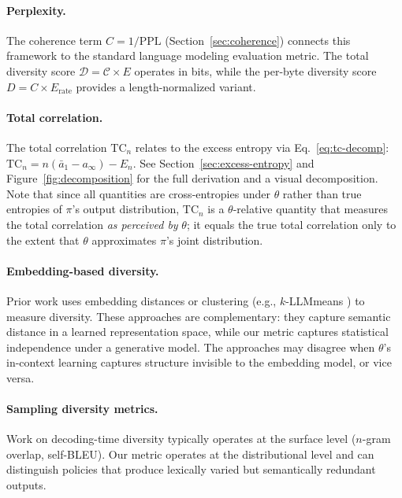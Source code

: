 \documentclass[11pt]{article}
\newcommand{\TC}{\mathrm{TC}}
\begin{document}
\paragraph{Perplexity.} The coherence term $C = 1/\mathrm{PPL}$ (Section~\ref{sec:coherence}) connects this framework to the standard language modeling evaluation metric. The total diversity score $\mathcal{D} = \mathcal{C} \times E$ operates in bits, while the per-byte diversity score $D = C \times E_{\mathrm{rate}}$ provides a length-normalized variant.

\paragraph{Total correlation.} The total correlation $\TC_n$ relates to the excess entropy via Eq.~\eqref{eq:tc-decomp}: $\TC_n = n(\bar{a}_1 - a_\infty) - E_n$. See Section~\ref{sec:excess-entropy} and Figure~\ref{fig:decomposition} for the full derivation and a visual decomposition. Note that since all quantities are cross-entropies under $\theta$ rather than true entropies of $\pi$'s output distribution, $\TC_n$ is a $\theta$-relative quantity that measures the total correlation \emph{as perceived by} $\theta$; it equals the true total correlation only to the extent that $\theta$ approximates $\pi$'s joint distribution.

\paragraph{Embedding-based diversity.} Prior work uses embedding distances or clustering (e.g., $k$-LLMmeans \citep{lai2024llmmeans}) to measure diversity. These approaches are complementary: they capture semantic distance in a learned representation space, while our metric captures statistical independence under a generative model. The approaches may disagree when $\theta$'s in-context learning captures structure invisible to the embedding model, or vice versa.

\paragraph{Sampling diversity metrics.} Work on decoding-time diversity \citep{zhang2024writingprompts} typically operates at the surface level ($n$-gram overlap, self-BLEU). Our metric operates at the distributional level and can distinguish policies that produce lexically varied but semantically redundant outputs.


\end{document}
